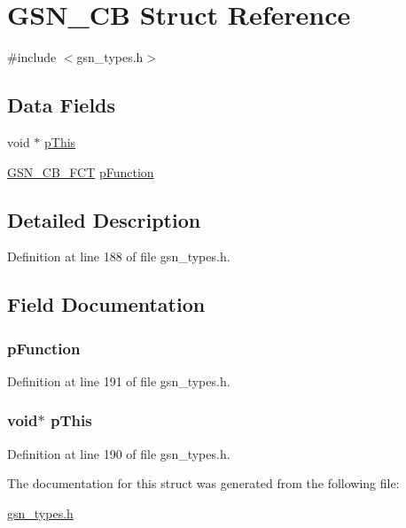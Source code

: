 \hypertarget{a00036}{
\section{GSN\_\-CB Struct Reference}
\label{a00036}
}


{\ttfamily \#include $<$gsn\_\-types.h$>$}

\subsection*{Data Fields}
\begin{DoxyCompactItemize}
\item 
void $\ast$ \hyperlink{a00036_a9603b95573753f229a989062644bdbc3}{pThis}
\item 
\hyperlink{a00599_ac4c0c28469f0b55f25aa4c54e7eefdc2}{GSN\_\-CB\_\-FCT} \hyperlink{a00036_a623fb37f0c629fc850c1afaf1ed09832}{pFunction}
\end{DoxyCompactItemize}


\subsection{Detailed Description}


Definition at line 188 of file gsn\_\-types.h.



\subsection{Field Documentation}
\hypertarget{a00036_a623fb37f0c629fc850c1afaf1ed09832}{
\subsubsection[{pFunction}]{ {\bf pFunction}}}
\label{a00036_a623fb37f0c629fc850c1afaf1ed09832}


Definition at line 191 of file gsn\_\-types.h.

\hypertarget{a00036_a9603b95573753f229a989062644bdbc3}{
\subsubsection[{pThis}]{\setlength{\rightskip}{0pt plus 5cm}void$\ast$ {\bf pThis}}}
\label{a00036_a9603b95573753f229a989062644bdbc3}


Definition at line 190 of file gsn\_\-types.h.



The documentation for this struct was generated from the following file:\begin{DoxyCompactItemize}
\item 
\hyperlink{a00599}{gsn\_\-types.h}\end{DoxyCompactItemize}
